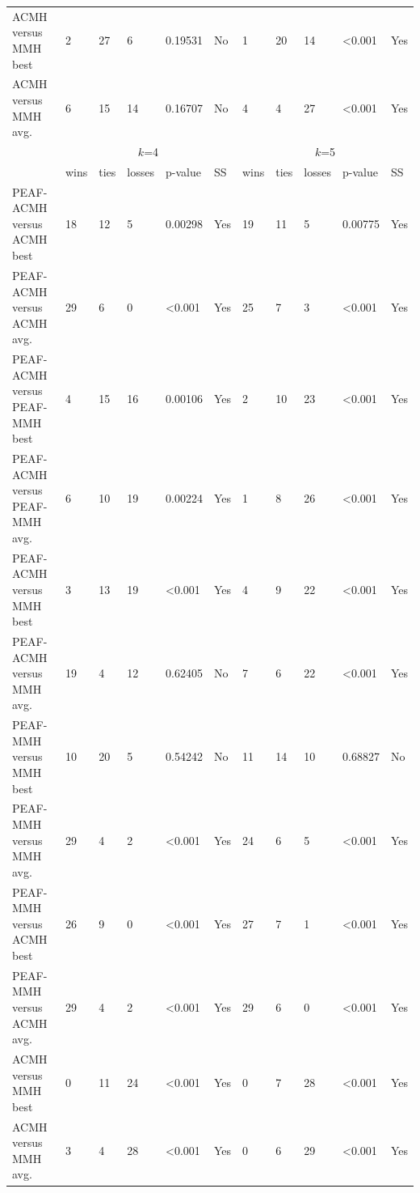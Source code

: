\documentclass[12pt, a4paper]{article}%
\numberwithin{equation}{section}
\theoremstyle{plain}
\begin{document}
{\begin{landscape}
\begin{longtable}{|l|lllll|lllll|}
							ACMH versus MMH best                   & 2    & 27   & 6      & 0.19531          & No  & 1    & 20   & 14     & \textless{}0.001 & Yes \\
							ACMH versus MMH avg.                   & 6    & 15   & 14     & 0.16707          & No  & 4    & 4    & 27     & \textless{}0.001 & Yes \\ \hline
							\multicolumn{1}{|c|}{\multirow{2}{*}{}} & \multicolumn{5}{c|}{$k$=4}                    & \multicolumn{5}{c|}{$k$=5}                    \\ \cline{2-11} 
							\multicolumn{1}{|c|}{}                  & wins & ties & losses & p-value          & SS  & wins & ties & losses & p-value          & SS  \\ \hline
							PEAF-ACMH versus ACMH best             & 18   & 12   & 5      & 0.00298          & Yes & 19   & 11   & 5      & 0.00775          & Yes \\
							PEAF-ACMH versus ACMH avg.             & 29   & 6    & 0      & \textless{}0.001 & Yes & 25   & 7    & 3      & \textless{}0.001 & Yes \\
							PEAF-ACMH versus PEAF-MMH best           & 4    & 15   & 16     & 0.00106          & Yes & 2    & 10   & 23     & \textless{}0.001 & Yes \\
							PEAF-ACMH versus PEAF-MMH avg.           & 6    & 10   & 19     & 0.00224          & Yes & 1    & 8    & 26     & \textless{}0.001 & Yes \\
							PEAF-ACMH versus MMH best               & 3    & 13   & 19     & \textless{}0.001 & Yes & 4    & 9    & 22     & \textless{}0.001 & Yes \\
							PEAF-ACMH versus MMH avg.               & 19   & 4    & 12     & 0.62405          & No  & 7    & 6    & 22     & \textless{}0.001 & Yes \\
							PEAF-MMH versus MMH best                 & 10   & 20   & 5      & 0.54242          & No  & 11   & 14   & 10     & 0.68827          & No  \\
							PEAF-MMH versus MMH avg.                 & 29   & 4    & 2      & \textless{}0.001 & Yes & 24   & 6    & 5      & \textless{}0.001 & Yes \\
							PEAF-MMH versus ACMH best               & 26   & 9    & 0      & \textless{}0.001 & Yes & 27   & 7    & 1      & \textless{}0.001 & Yes \\
							PEAF-MMH versus ACMH avg.               & 29   & 4    & 2      & \textless{}0.001 & Yes & 29   & 6    & 0      & \textless{}0.001 & Yes \\
							ACMH versus MMH best                   & 0    & 11   & 24     & \textless{}0.001 & Yes & 0    & 7    & 28     & \textless{}0.001 & Yes \\
							ACMH versus MMH avg.                   & 3    & 4    & 28     & \textless{}0.001 & Yes & 0    & 6    & 29     & \textless{}0.001 & Yes \\ \hline
						\end{longtable}
					\end{landscape}
				}
				
\end{document}

